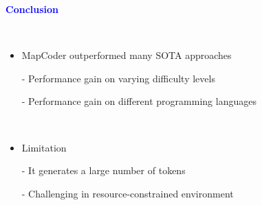\documentclass[professionalfont]{beamer}
\begin{document}
\begin{frame}
\begin{center}
    { \textbf{\textcolor{blue}{ {\fontsize{12}{14}\selectfont Conclusion} }} }
\end{center}
\\[0.5cm]

{\fontsize{10}{14}\selectfont 
\begin{itemize}
    \item MapCoder outperformed many SOTA approaches
    
    - Performance gain on varying difficulty levels

    - Performance gain on different programming languages
\end{itemize}
\\[0.5cm]

\begin{itemize}
    \item Limitation
    
    - It generates a large number of tokens
    
    - Challenging in resource-constrained environment
\end{itemize}
}
\end{frame}
\end{document}
